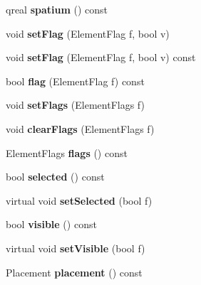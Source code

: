 \begin{DoxyCompactItemize}
qreal {\bfseries spatium} () const
\item 
\mbox{\label{class_ms_1_1_element_afbd51224c47d00551983d1b25f3c6f39}} 
void {\bfseries set\+Flag} (Element\+Flag f, bool v)
\item 
\mbox{\label{class_ms_1_1_element_ac28da1fe20339f2277852976ac6d7d8f}} 
void {\bfseries set\+Flag} (Element\+Flag f, bool v) const
\item 
\mbox{\label{class_ms_1_1_element_aedd1f66a4881665f277bc30fefe765b2}} 
bool {\bfseries flag} (Element\+Flag f) const
\item 
\mbox{\label{class_ms_1_1_element_a5a3ecc094ac8f4bc0cff51eef0b58a5f}} 
void {\bfseries set\+Flags} (Element\+Flags f)
\item 
\mbox{\label{class_ms_1_1_element_a1464c2a43fca79ae654dc37064222755}} 
void {\bfseries clear\+Flags} (Element\+Flags f)
\item 
\mbox{\label{class_ms_1_1_element_ae7e8d5928732f4b0c60cf6bc0060eb32}} 
Element\+Flags {\bfseries flags} () const
\item 
\mbox{\label{class_ms_1_1_element_ae4f2f3a774def87e608afd55ef29b3e9}} 
bool {\bfseries selected} () const
\item 
\mbox{\label{class_ms_1_1_element_aa7d9ce43d66fd04a403e2242051dd7a8}} 
virtual void {\bfseries set\+Selected} (bool f)
\item 
\mbox{\label{class_ms_1_1_element_a9f91ce44289781c10fbaab9f5867d387}} 
bool {\bfseries visible} () const
\item 
\mbox{\label{class_ms_1_1_element_a41438f8c28ffb2eb06d55de8360c1969}} 
virtual void {\bfseries set\+Visible} (bool f)
\item 
\mbox{\label{class_ms_1_1_element_a951493711a51487f7f3c1786703b1a20}} 
Placement {\bfseries placement} () const
\item 

\end{DoxyCompactItemize}
